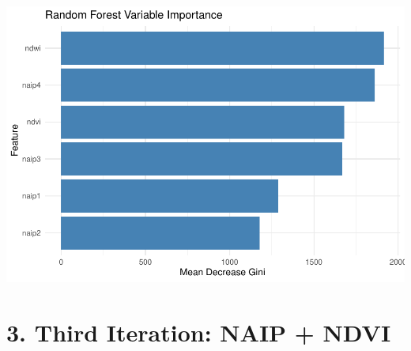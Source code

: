 \documentclass[
]{article}
\begin{document}
\includegraphics{veg_model_new_class_files/figure-latex/unnamed-chunk-9-3.pdf}

\section{3. Third Iteration: NAIP +
NDVI}\label{third-iteration-naip-ndvi}
\end{document}
